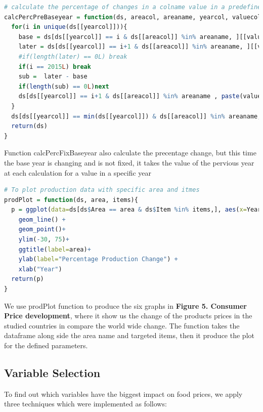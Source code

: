 \documentclass[11pt]{article}
\begin{document}
\begin{lstlisting}[language= R, captionpos=b,caption=\href{https://github.com/jaidikam/sps_ws1718/tree/master/Qfolder7}{SPL\_Q7\_countries\_exploration.R}]
# calculate the percentage of changes in a colname value in a predefined year, where the base is for every change is the value from the previous year.
calcPercPreBaseyear = function(ds, areacol, areaname, yearcol, valuecol){
  for(i in unique(ds[[yearcol]])){
    base = ds[ds[[yearcol]] == i & ds[[areacol]] %in% areaname, ][[valuecol]]
    later = ds[ds[[yearcol]] == i+1 & ds[[areacol]] %in% areaname, ][[valuecol]]
    #if(length(later) == 0L) break
    if(i == 2015L) break
    sub =  later - base
    if(length(sub) == 0L)next 
    ds[ds[[yearcol]] == i+1 & ds[[areacol]] %in% areaname , paste(valuecol, "Percent", sep = "_")]= (sub / later) * 100
  }
  ds[ds[[yearcol]] == min(ds[[yearcol]]) & ds[[areacol]] %in% areaname, paste(valuecol, "Percent", sep = "_")]= 0
  return(ds)
}
\end{lstlisting}

Function calcPercFixBaseyear also calculate the precentage change, but this time the base year is changing and is not fixed, it takes the value of the pervious year at each calculation for a value in a specific year   

\begin{lstlisting}[language= R, captionpos=b,caption=\href{https://github.com/jaidikam/sps_ws1718/tree/master/Qfolder7}{SPL\_Q7\_countries\_exploration.R}]
# To plot production data with specific area and itmes
prodPlot = function(ds, area, items){
  p = ggplot(data=ds[ds$Area == area & ds$Item %in% items,], aes(x=Year, y=Percentage, colour=Item)) +
    geom_line() +
    geom_point()+
    ylim(-30, 75)+
    ggtitle(label=area)+
    ylab(label="Percentage Production Change") +
    xlab("Year")
  return(p)
}
\end{lstlisting}
We use prodPlot function to produce the six graphs in \textbf{Figure 5. Consumer Price development}, where it show us the change of the products prices in the studied countries in compare the world wide change. The function takes the dataframe along side the area name and targeted items, then it produce the plot for the defined parameters. 


\subsection{Variable Selection}

To find out which variables have the biggest impact on food prices, we apply three techniques which were implemented as follows:
\end{document}
